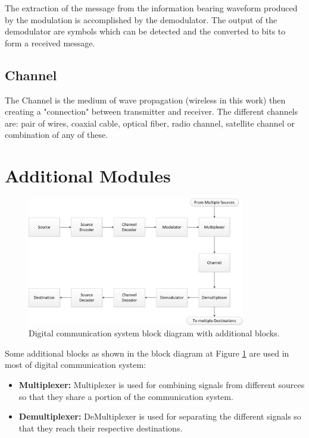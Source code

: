 The extraction of the message from the information bearing waveform produced by
the modulation is accomplished by the demodulator. The output of the demodulator
are symbols which can be detected and the converted to bits to form a received
message.

\subsection{Channel}

The Channel is the medium of wave propagation (wireless in this work) then
creating a "connection" between transmitter and receiver. The different channels
are: pair of wires, coaxial cable, optical fiber, radio channel, satellite
channel or combination of any of these.

\section{Additional Modules}

\begin{figure}[htbp]
    \centering
    \includegraphics[width=0.85\textwidth]{./figures/digicom_plus}
    \caption{ Digital communication system block diagram with additional blocks.
    \label{fig:digicomplus}}
\end{figure}

Some additional blocks as shown in the block diagram  at Figure \ref{fig:digicomplus}
are used in most of digital communication system:

\begin{itemize}


  \item \textbf{Multiplexer:} Multiplexer is used for combining signals from
different sources so that they share a portion of the communication system.

  \item \textbf{Demultiplexer:} DeMultiplexer is used for separating the different
signals so that they reach their respective destinations.


\end{itemize}

